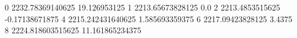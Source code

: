 0 2232.78369140625 19.126953125
1 2213.65673828125 0.0
2 2213.4853515625 -0.17138671875
4 2215.242431640625 1.585693359375
6 2217.09423828125 3.4375
8 2224.818603515625 11.161865234375
